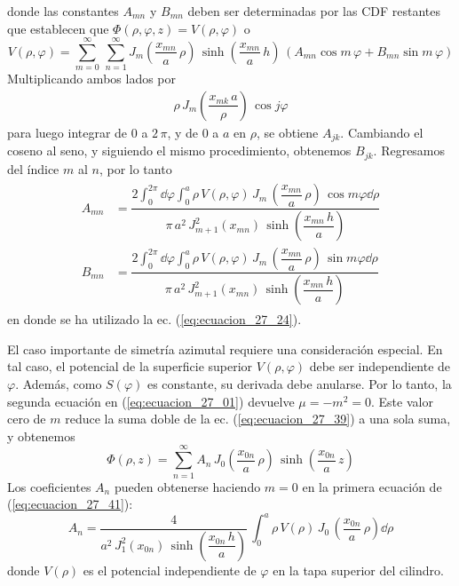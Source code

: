 donde las constantes $A_{mn}$ y $B_{mn}$ deben ser determinadas por las CDF restantes que establecen que $\Phi (\rho, \varphi, z) = V(\rho, \varphi)$ o
\begin{equation}
V (\rho, \varphi) = \sum_{m=0}^{\infty} \, \sum_{n=1}^{\infty} J_{m} \left( \dfrac{x_{mn}}{a}  \, \rho \right) \, \sinh \left( \dfrac{x_{mn}}{a}  \, h \right) \, (A_{mn} \cos m \, \varphi + B_{mn} \sin m \, \varphi )
\label{eq:ecuacion_27_40}
\end{equation}
Multiplicando ambos lados por
\begin{align*}
\rho \, J_{m} \left( \dfrac{x_{mk} \, a}{\rho} \right) \, \cos j \varphi
\end{align*}
para luego integrar de $0$ a $2 \, \pi$, y de $0$ a $a$ en $\rho$, se obtiene $A_{jk}$. Cambiando el coseno al seno, y siguiendo el mismo procedimiento, obtenemos $B_{jk}$. Regresamos del índice $m$ al $n$, por lo tanto
\begin{align}
\begin{aligned}
A_{mn} &= \dfrac{\displaystyle 2 \int_{0}^{2 \pi} \dd{\varphi} \int_{0}^{a} \rho \, V (\rho, \varphi) \, J_{m} \, \left( \dfrac{x_{mn}}{a}  \, \rho \right) \, \cos m \varphi \dd{\rho}}{\pi \, a^{2} \, J_{m+1}^{2} (x_{mn}) \, \sinh \left( \dfrac{x_{mn} \, h}{a} \right) } \\[1em]
B_{mn} &= \dfrac{\displaystyle 2 \int_{0}^{2 \pi} \dd{\varphi} \int_{0}^{a} \rho \, V (\rho, \varphi) \, J_{m} \, \left( \dfrac{x_{mn}}{a}  \, \rho \right) \, \sin m \varphi \dd{\rho}}{\pi \, a^{2} \, J_{m+1}^{2} (x_{mn}) \, \sinh \left( \dfrac{x_{mn} \, h}{a} \right) }
\end{aligned}
\label{eq:ecuacion_27_41}
\end{align}
en donde se ha utilizado la ec. (\ref{eq:ecuacion_27_24}).
\par
El caso importante de simetría azimutal requiere una consideración especial. En tal caso, el potencial de la superficie superior $V (\rho, \varphi)$ debe ser independiente de $\varphi$. Además, como $S (\varphi)$ es constante, su derivada debe anularse. Por lo tanto, la segunda ecuación en (\ref{eq:ecuacion_27_01}) devuelve $\mu = -m^{2} = 0$. Este valor cero de $m$ reduce la suma doble de la ec. (\ref{eq:ecuacion_27_39}) a una sola suma, y obtenemos
\begin{equation}
\Phi (\rho, z) = \sum_{n=1}^{\infty} A_{n} \, J_{0} \left( \dfrac{x_{0n}}{a}  \, \rho \right) \, \sinh \left( \dfrac{x_{0n}}{a}  \, z \right)
\label{eq:ecuacion_27_42}
\end{equation}
Los coeficientes $A_{n}$ pueden obtenerse haciendo $m = 0$ en la primera ecuación de (\ref{eq:ecuacion_27_41}):
\begin{equation}
A_{n} = \dfrac{4}{a^{2} \, J_{1}^{2} (x_{0n}) \, \sinh \left( \dfrac{x_{0n} \, h}{a} \right)} \, \int_{0}^{a} \rho \, V (\rho) \, J_{0} \, \left( \dfrac{x_{0n}}{a}  \, \rho \right) \dd{\rho}
\label{eq:ecuacion_27_43}
\end{equation}
donde $V(\rho)$ es el potencial independiente de $\varphi$ en la tapa superior del cilindro.
